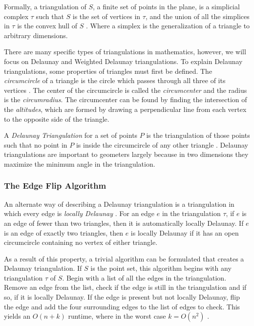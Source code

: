 \documentclass[11pt]{article}
\begin{document}
Formally, a triangulation of $S$, a finite set of points in the plane, is a simplicial complex $\tau$ such that $S$ is the set of vertices in $\tau$, and the union of all the simplices in $\tau$ is the convex hull of $S$ \cite{meshGeneration}. Where a simplex is the generalization of a triangle to arbitrary dimensions.

There are many specific types of triangulations in mathematics, however, we will focus on Delaunay and Weighted Delaunay triangulations. To explain Delaunay triangulations, some properties of triangles must first be defined. The \emph{circumcircle} of a triangle is the circle which passes through all three of its vertices \cite{mathworld:Circumcenter}. The center of the circumcircle is called the \emph{circumcenter} and the radius is the \emph{circumradius}. The circumcenter can be found by finding the intersection of the \emph{altitudes}, which are formed by drawing a perpendicular line from each vertex to the opposite side of the triangle.
  
A \emph{Delaunay Triangulation} for a set of points $P$ is the triangulation of those points such that no point in $P$ is inside the circumcircle of any other triangle \cite{meshGeneration}. Delaunay triangulations are important to geometers largely because in two dimensions they maximize the minimum angle in the triangulation.

\subsubsection{The Edge Flip Algorithm}
An alternate way of describing a Delaunay triangulation is a triangulation in which every edge is \emph{locally Delaunay} \cite{meshGeneration}. For an edge $e$ in the triangulation $\tau$, if $e$ is an edge of fewer than two triangles, then it is automatically locally Delaunay. If $e$ is an edge of exactly two triangles, then $e$ is locally Delaunay if it has an open circumcircle containing no vertex of either triangle. 

As a result of this property, a trivial algorithm can be formulated that creates a Delaunay triangulation. If $S$ is the point set, this algorithm begins with any triangulation $\tau$ of $S$. Begin with a list of all the edges in the triangulation. Remove an edge from the list, check if the edge is still in the triangulation and if so, if it is locally Delaunay. If the edge is present but not locally Delaunay, flip the edge and add the four surrounding edges to the list of edges to check. This yields an $O(n + k)$ runtime, where in the worst case $k = O(n^2)$ \cite{meshGeneration}.
\end{document}
